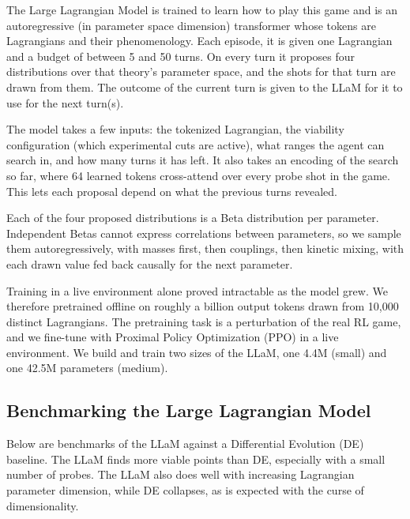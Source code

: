 \documentclass[11pt]{article}
\newcommand{\figplace}[3][]{%
  \begin{tcolorbox}[colback=blue!4,colframe=blue!40!black,
                    title={Figure: \texttt{#2}\ifx\relax#1\relax\else\ (#1)\fi}]
  \emph{Caption:} #3
  \end{tcolorbox}}
\begin{document}
The Large Lagrangian Model is trained to learn how to play this game and is an autoregressive (in parameter space dimension) transformer whose tokens are Lagrangians and their phenomenology.  Each episode, it is given one Lagrangian and a budget of between 5 and 50 turns. 
On every turn it proposes four distributions over that theory's parameter space, and the shots for that turn are drawn from them. The outcome of the current turn is given to the LLaM for it to use for the next turn(s).

The model takes a few inputs: the tokenized Lagrangian, the viability configuration (which experimental cuts are active), what ranges the agent can search in, and how many turns it has left. It also takes an encoding of the search so far, where 64 learned tokens
cross-attend over every probe shot in the game. This lets each proposal depend on what the previous turns revealed.

Each of the four proposed distributions is a Beta distribution per parameter. Independent Betas cannot express correlations between parameters, so
we sample them autoregressively, with masses first, then couplings, then kinetic mixing, with each drawn value fed back causally for the next parameter. 

Training in a live environment alone proved intractable as the model grew. We therefore pretrained offline on roughly a billion output tokens drawn from 10,000 distinct Lagrangians. The pretraining task is a perturbation of the real RL game, and we fine-tune with Proximal Policy Optimization (PPO) in a live environment. We build and train two sizes of the LLaM, one 4.4M (small) and one 42.5M parameters (medium).

\subsection{Benchmarking the Large Lagrangian Model}
Below are benchmarks of the LLaM against a Differential Evolution (DE) baseline. The LLaM finds more viable points than DE, especially with a small number of probes. The LLaM also does well with increasing Lagrangian parameter dimension, while DE collapses, as is expected with the curse of dimensionality.
\end{document}
